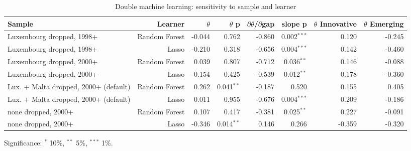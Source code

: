 \begin{table}[htbp]
\centering\small
\caption{Double machine learning: sensitivity to sample and learner}
\label{tab:dml}
\begin{tabular}{lrrrrrrr}
\toprule
Sample & Learner & $\theta$ & $\theta$ p & $\partial$$\theta$/$\partial$gap & slope p & $\theta$ Innovative & $\theta$ Emerging \\
\midrule
Luxembourg dropped, 1998+ & Random Forest & -0.044 & 0.762 & -0.860 & 0.002$^{***}$ & 0.120 & -0.245 \\
Luxembourg dropped, 1998+ & Lasso & -0.210 & 0.318 & -0.656 & 0.004$^{***}$ & 0.142 & -0.460 \\
Luxembourg dropped, 2000+ & Random Forest & 0.039 & 0.807 & -0.712 & 0.036$^{**}$ & 0.146 & -0.088 \\
Luxembourg dropped, 2000+ & Lasso & -0.154 & 0.425 & -0.539 & 0.012$^{**}$ & 0.178 & -0.360 \\
Lux. + Malta dropped, 2000+ (default) & Random Forest & 0.262 & 0.041$^{**}$ & -0.187 & 0.520 & 0.155 & 0.405 \\
Lux. + Malta dropped, 2000+ (default) & Lasso & 0.011 & 0.955 & -0.676 & 0.004$^{***}$ & 0.209 & -0.186 \\
none dropped, 2000+ & Random Forest & 0.107 & 0.417 & -0.381 & 0.025$^{**}$ & 0.227 & -0.091 \\
none dropped, 2000+ & Lasso & -0.346 & 0.014$^{**}$ & 0.146 & 0.266 & -0.359 & -0.320 \\
\bottomrule
\end{tabular}
\par\footnotesize Significance: $^{*}$ 10\%, $^{**}$ 5\%, $^{***}$ 1\%.
\end{table}
